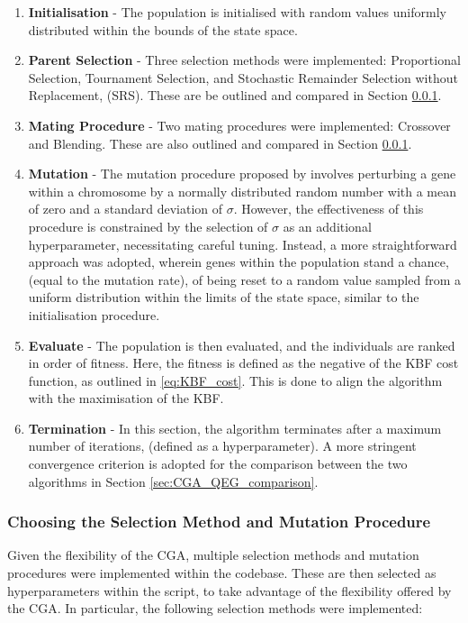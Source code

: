 \documentclass[10pt]{article}
\begin{document}
\begin{multicols}{2}
\begin{enumerate}
    \item \textbf{Initialisation} - The population is initialised with random values uniformly distributed within the bounds of the state space.
    \item \textbf{Parent Selection} - Three selection methods were implemented: Proportional Selection, Tournament Selection, and Stochastic Remainder Selection without Replacement, (SRS). These are be outlined and compared in Section \ref{sec:CGA_selection_mutation}.
    \item \textbf{Mating Procedure} - Two mating procedures were implemented: Crossover and Blending. These are also outlined and compared in Section \ref{sec:CGA_selection_mutation}.
    \item \textbf{Mutation} - The mutation procedure proposed by \cite{PGA} involves perturbing a gene within a chromosome by a normally distributed random number with a mean of zero and a standard deviation of $\sigma$. However, the effectiveness of this procedure is constrained by the selection of $\sigma$ as an additional hyperparameter, necessitating careful tuning. Instead, a more straightforward approach was adopted, wherein genes within the population stand a chance, (equal to the mutation rate), of being reset to a random value sampled from a uniform distribution within the limits of the state space, similar to the initialisation procedure.
    \item \textbf{Evaluate} - The population is then evaluated, and the individuals are ranked in order of fitness. Here, the fitness is defined as the negative of the KBF cost function, as outlined in \ref{eq:KBF_cost}. This is done to align the algorithm with the maximisation of the KBF.
    \item \textbf{Termination} - In this section, the algorithm terminates after a maximum number of iterations, (defined as a hyperparameter). A more stringent convergence criterion is adopted for the comparison between the two algorithms in Section \ref{sec:CGA_QEG_comparison}.
\end{enumerate}


\subsubsection{Choosing the Selection Method and Mutation Procedure}
\label{sec:CGA_selection_mutation}

Given the flexibility of the CGA, multiple selection methods and mutation procedures were implemented within the codebase. These are then selected as hyperparameters within the script, %
to take advantage of the flexibility offered by the CGA. In particular, the following selection methods were implemented:


\end{multicols}
\end{document}
